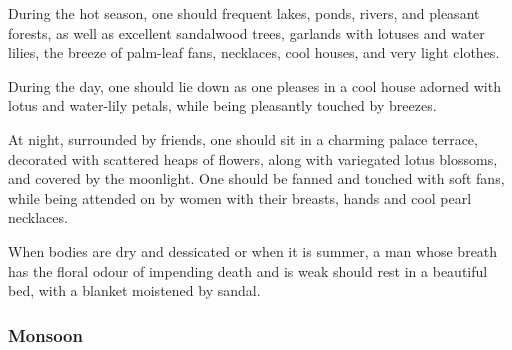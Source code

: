 \begin{translation}
	\item[56--57]
	During the hot season, one should frequent lakes, ponds, %
	rivers, and pleasant forests, as well as excellent sandalwood trees, %
	garlands with lotuses and water lilies, %
	the breeze of palm-leaf fans,  %
	necklaces, %
	cool houses, %
	and very light clothes.

	\item[58]
	During the day, one should lie down as one pleases %
	in a cool house adorned with lotus and water-lily petals, %
	while being pleasantly touched by breezes. %

	\item[59--60]
	At night, surrounded by friends, %
	one should sit in a charming %
	palace terrace, %
	decorated with scattered heaps %
	of flowers, along with variegated lotus blossoms, %
	and covered by the moonlight.
	One should be fanned and touched with soft fans, %
	while being attended on by women %
	with their breasts, hands and cool pearl necklaces.

	\item[61] %
	When bodies are dry and dessicated or when it is summer, %
	a man whose breath has the floral odour of impending death  %
	and is weak %
	should rest in a beautiful bed, with a blanket moistened by sandal. %


	\subsubsection{Monsoon}%


\end{translation}
